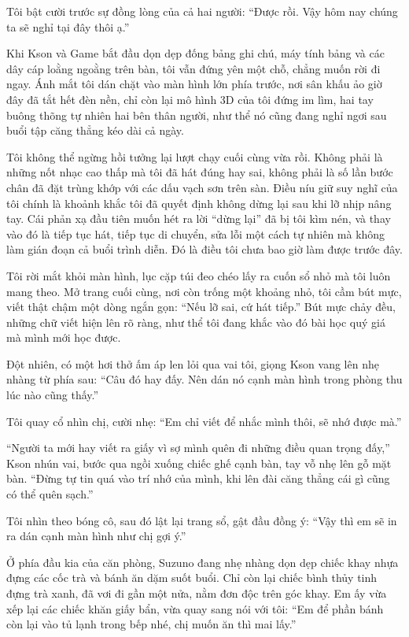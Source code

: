 ﻿\documentclass[../main.tex]{subfiles}
\begin{document}
Tôi bật cười trước sự đồng lòng của cả hai người: ``Được rồi. Vậy hôm nay chúng ta sẽ nghỉ tại đây thôi ạ.''

\ct

Khi Kson và Game bắt đầu dọn dẹp đống bảng ghi chú, máy tính bảng và các dây cáp loằng ngoằng trên bàn, tôi vẫn đứng yên một chỗ, chẳng muốn rời đi ngay. Ánh mắt tôi dán chặt vào màn hình lớn phía trước, nơi sân khấu ảo giờ đây đã tắt hết đèn nền, chỉ còn lại mô hình 3D của tôi đứng im lìm, hai tay buông thõng tự nhiên hai bên thân người, như thể nó cũng đang nghỉ ngơi sau buổi tập căng thẳng kéo dài cả ngày.

Tôi không thể ngừng hồi tưởng lại lượt chạy cuối cùng vừa rồi. Không phải là những nốt nhạc cao thấp mà tôi đã hát đúng hay sai, không phải là số lần bước chân đã đặt trùng khớp với các dấu vạch sơn trên sàn. Điều níu giữ suy nghĩ của tôi chính là khoảnh khắc tôi đã quyết định không dừng lại sau khi lỡ nhịp nâng tay. Cái phản xạ đầu tiên muốn hét ra lời ``dừng lại'' đã bị tôi kìm nén, và thay vào đó là tiếp tục hát, tiếp tục di chuyển, sửa lỗi một cách tự nhiên mà không làm gián đoạn cả buổi trình diễn. Đó là điều tôi chưa bao giờ làm được trước đây.

Tôi rời mắt khỏi màn hình, lục cặp túi đeo chéo lấy ra cuốn sổ nhỏ mà tôi luôn mang theo. Mở trang cuối cùng, nơi còn trống một khoảng nhỏ, tôi cầm bút mực, viết thật chậm một dòng ngắn gọn: ``Nếu lỡ sai, cứ hát tiếp.'' Bút mực chảy đều, những chữ viết hiện lên rõ ràng, như thể tôi đang khắc vào đó bài học quý giá mà mình mới học được.

Đột nhiên, có một hơi thở ấm áp len lỏi qua vai tôi, giọng Kson vang lên nhẹ nhàng từ phía sau: ``Câu đó hay đấy. Nên dán nó cạnh màn hình trong phòng thu lúc nào cũng thấy.''

Tôi quay cổ nhìn chị, cười nhẹ: ``Em chỉ viết để nhắc mình thôi, sẽ nhớ được mà.''

``Người ta mới hay viết ra giấy vì sợ mình quên đi những điều quan trọng đấy,'' Kson nhún vai, bước qua ngồi xuống chiếc ghế cạnh bàn, tay vỗ nhẹ lên gỗ mặt bàn. ``Đừng tự tin quá vào trí nhớ của mình, khi lên đài căng thẳng cái gì cũng có thể quên sạch.''

Tôi nhìn theo bóng cô, sau đó lật lại trang sổ, gật đầu đồng ý: ``Vậy thì em sẽ in ra dán cạnh màn hình như chị gợi ý.''

Ở phía đầu kia của căn phòng, Suzuno đang nhẹ nhàng dọn dẹp chiếc khay nhựa đựng các cốc trà và bánh ăn dặm suốt buổi. Chỉ còn lại chiếc bình thủy tinh đựng trà xanh, đã vơi đi gần một nửa, nằm đơn độc trên góc khay. Em ấy vừa xếp lại các chiếc khăn giấy bẩn, vừa quay sang nói với tôi: ``Em để phần bánh còn lại vào tủ lạnh trong bếp nhé, chị muốn ăn thì mai lấy.''
\end{document}
